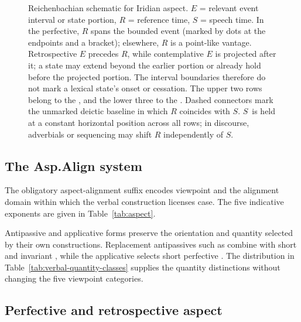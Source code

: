 \begin{figure}[t]
\caption{Reichenbachian schematic for Iridian aspect. $E$ = relevant event
interval or state portion, $R$ = reference time, $S$ = speech time. In the
perfective, $R$ spans the bounded event (marked by dots at the endpoints and
a bracket); elsewhere, $R$ is a point-like vantage. Retrospective $E$ precedes
$R$, while contemplative $E$ is projected after it; a state may extend beyond
the earlier portion or already hold before the projected portion. The
interval boundaries therefore do not mark a lexical state's onset or
cessation. The upper two rows belong to the , and
the lower three to the . Dashed connectors mark
the unmarked deictic baseline in which $R$ coincides with $S$. $S$~is held at
a constant horizontal position across all rows; in discourse, adverbials or
sequencing may shift $R$ independently of $S$.}
\label{fig:iridian-aspect-reichenbach}
\end{figure}

\subsection{The Asp.Align system}\label{sec:vm-asp}

The obligatory aspect-alignment suffix encodes viewpoint and the alignment
domain within which the verbal construction licenses case. The five indicative
exponents are given in Table~\ref{tab:aspect}.



Antipassive and applicative forms preserve the orientation and quantity
selected by their own constructions. Replacement antipassives such as
 combine with short  and invariant , while the
applicative  selects short perfective .
The distribution in Table~\ref{tab:verbal-quantity-classes} supplies the
quantity distinctions without changing the five viewpoint categories.

\subsection{Perfective and retrospective aspect}\label{sec:aspect-pf}

